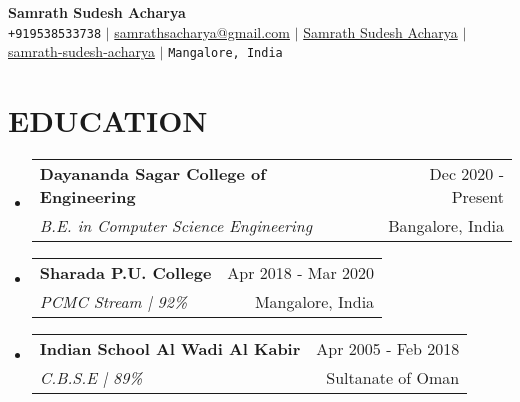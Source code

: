 \documentclass[letterpaper,11pt]{article}
\makeatletter
\newcommand{\resumeItem}[1]{
  \item\small{
    {#1 \vspace{-1pt}}
  }
}
\newcommand{\resumeSubheading}[4]{
  \vspace{-1pt}\item
    \begin{tabular*}{\textwidth}[t]{l@{\extracolsep{\fill}}r}
      \textbf{#1} & {\color{dark-grey}\small #2}\vspace{1pt}\\ %
      \textit{#3} & {\color{dark-grey} \small #4}\\ %
    \end{tabular*}\vspace{-4pt}
}
\newcommand{\resumeSubHeadingListStart}{\begin{itemize}[leftmargin=0in, label={}]}
\newcommand{\resumeSubHeadingListEnd}{\end{itemize}}
\newcommand{\resumeItemListStart}{\begin{itemize}}
\newcommand{\resumeItemListEnd}{\end{itemize}\vspace{0pt}}
\makeatother
\begin{document}
\begin{center}
    \textbf{\Huge Samrath Sudesh Acharya} \\ \vspace{5pt}
    \small \faPhone \texttt{+919538533738} \hspace{1pt} $|$
    \hspace{1pt} \faEnvelope \hspace{2pt} \href{mailto:samrathsacharya@gmail.com}{samrathsacharya@gmail.com} \hspace{1pt} $|$ 
    \hspace{1pt} \faLinkedinSquare \hspace{2pt} \href{https://www.linkedin.com/in/samrath-sudesh-acharya/}{Samrath Sudesh Acharya} \hspace{1pt} $|$
    \hspace{1pt} \faGithub \hspace{2pt} \href{https://github.com/samrath-sudesh-acharya}{samrath-sudesh-acharya}
    \hspace{1pt} $|$
    \hspace{1pt} \faMapMarker* \hspace{2pt}\texttt{Mangalore, India} 
    \\ \vspace{-3pt}
\end{center}

\section {EDUCATION}
  \resumeSubHeadingListStart
    \resumeSubheading
      {Dayananda Sagar College of Engineering}{Dec 2020 - Present}
      {B.E. in Computer Science Engineering}{Bangalore, India}
        
    \resumeSubheading
      {Sharada P.U. College}{Apr 2018 - Mar 2020}
      {PCMC Stream | 92\%}{Mangalore, India}
    
    \resumeSubheading
      {Indian School Al Wadi Al Kabir}{Apr 2005 - Feb 2018}
      {C.B.S.E | 89\%}{Sultanate of Oman}
  \resumeSubHeadingListEnd

\end{document}
